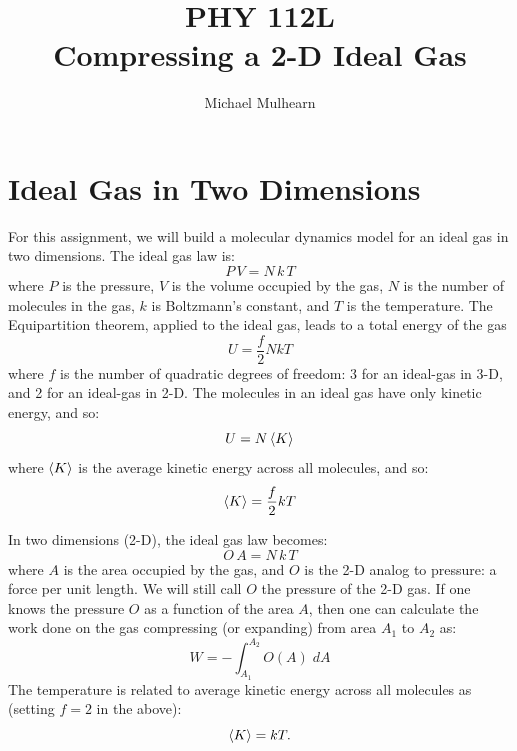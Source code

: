 \documentclass[12pt]{article}
\begin{document}
\title{PHY 112L \\ Compressing a 2-D Ideal Gas }
\author{Michael Mulhearn}

\maketitle

\section{Ideal Gas in Two Dimensions}

\noindent
For this assignment, we will build a molecular dynamics model for an
ideal gas in two dimensions.  The ideal gas law is:
\begin{equation}
P \, V  = N \, k \, T
\end{equation}
where $P$ is the pressure, $V$ is the volume occupied by the gas, $N$
is the number of molecules in the gas, $k$ is Boltzmann's constant,
and $T$ is the temperature.  The Equipartition theorem, applied to the ideal gas, leads to a total energy of the gas
\begin{equation}
U = \frac{f}{2}NkT
\end{equation}
where $f$ is the number of quadratic degrees of freedom: 3 for an
ideal-gas in 3-D, and 2 for an ideal-gas in 2-D.  The molecules in an
ideal gas have only kinetic energy, and so:
$$U = N\braket{K}$$
where $\braket{K}$ is the average kinetic energy across all molecules, and so:
\begin{equation}
\braket{K} = \frac{f}{2}kT
\end{equation}

In two dimensions (2-D), the ideal gas law becomes:
\begin{equation}
O \, A  = N \, k \, T
\end{equation}
where $A$ is the area occupied by the gas, and $O$ is the 2-D analog
to pressure: a force per unit length.  We will still call $O$ the
pressure of the 2-D gas.  If one knows the pressure $O$ as a function of the area $A$, then one can calculate the work done on the gas compressing (or expanding) from area $A_1$ to $A_2$ as:
\begin{equation}
W = -\int_{A_1}^{A_2} O(A) \; dA
\end{equation}
The temperature is related to average kinetic energy across all molecules as (setting $f=2$ in the above):
\begin{equation}
\braket{K} = kT.
\end{equation}
\end{document}
